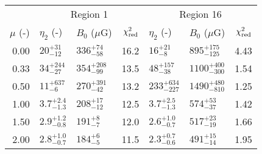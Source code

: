 \begin{tabular}{@{} r llr llr @{}}

\toprule
{} & \multicolumn{3}{c}{Region 1}
   & \multicolumn{3}{c}{Region 16} \\
\cmidrule(lr){2-4} \cmidrule(l){5-7}
$\mu$ (-) & $\eta_2$ (-) & $B_0$ ($\mu$G) & $\chi^2_{\mathrm{red}}$
          & $\eta_2$ (-) & $B_0$ ($\mu$G) & $\chi^2_{\mathrm{red}}$ \\
\cmidrule{1-7}
0.00 & ${20}^{+31}_{-12}$    & ${336}^{+74}_{-58}$ & 16.2
     & ${16}^{+21}_{-8}$     & ${895}^{+175}_{-125}$ & 4.43 \\
0.33 & ${34}^{+244}_{-27}$   & ${354}^{+208}_{-99}$ & 13.5
     & ${48}^{+157}_{-38}$   & ${1100}^{+400}_{-300}$ & 1.54 \\
0.50 & ${11}^{+637}_{-6}$    & ${270}^{+391}_{-42}$ & 13.2
     & ${233}^{+634}_{-227}$ & ${1490}^{+480}_{-810}$ & 1.25 \\
1.00 & ${3.7}^{+2.4}_{-1.3}$ & ${208}^{+17}_{-12}$ & 12.5
     & ${3.7}^{+2.5}_{-1.3}$ & ${574}^{+53}_{-37}$ & 1.42 \\
1.50 & ${2.9}^{+1.2}_{-0.8}$ & ${191}^{+8}_{-7}$ & 12.0
     & ${2.6}^{+1.0}_{-0.7}$ & ${517}^{+23}_{-19}$ & 1.66 \\
2.00 & ${2.8}^{+1.0}_{-0.7}$ & ${184}^{+6}_{-5}$ & 11.5
     & ${2.3}^{+0.7}_{-0.6}$ & ${491}^{+15}_{-14}$ & 1.95 \\
\bottomrule
\end{tabular}







